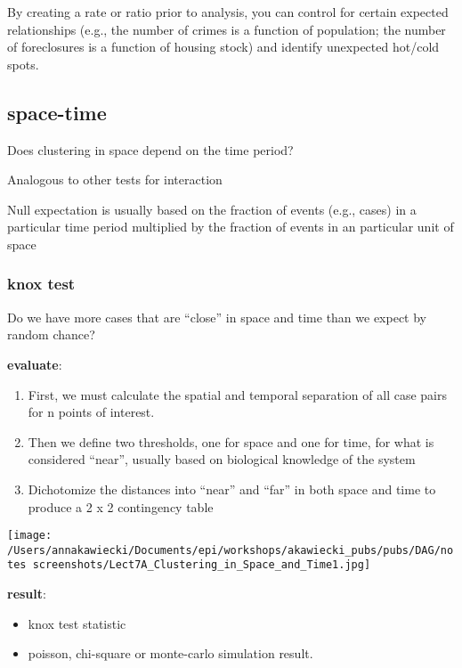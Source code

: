 \documentclass[
]{article}
\begin{document}
By creating a rate or ratio prior to analysis, you can control for
certain expected relationships (e.g., the number of crimes is a function
of population; the number of foreclosures is a function of housing
stock) and identify unexpected hot/cold spots.

\hypertarget{space-time}{%
\subsection{space-time}\label{space-time}}

Does clustering in space depend on the time period?

Analogous to other tests for interaction

Null expectation is usually based on the fraction of events (e.g.,
cases) in a particular time period multiplied by the fraction of events
in an particular unit of space

\hypertarget{knox-test}{%
\subsubsection{knox test}\label{knox-test}}

Do we have more cases that are ``close'' in space and time than we
expect by random chance?

\textbf{evaluate}:

\begin{enumerate}
\def\labelenumi{\arabic{enumi}.}
\item
  First, we must calculate the spatial and temporal separation of all
  case pairs for n points of interest.
\item
  Then we define two thresholds, one for space and one for time, for
  what is considered ``near'', usually based on biological knowledge of
  the system
\item
  Dichotomize the distances into ``near'' and ``far'' in both space and
  time to produce a 2 x 2 contingency table
\end{enumerate}

\texttt{[image: /Users/annakawiecki/Documents/epi/workshops/akawiecki\_pubs/pubs/DAG/notes screenshots/Lect7A\_Clustering\_in\_Space\_and\_Time1.jpg]}

\textbf{result}:

\begin{itemize}
\item
  knox test statistic
\item
  poisson, chi-square or monte-carlo simulation result.
\end{itemize}
\end{document}
